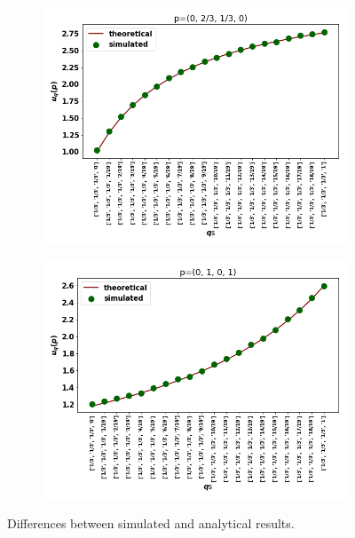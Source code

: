 \documentclass[10pt]{article}
\begin{document}
\begin{figure}[!htbp]
\begin{center}
    \begin{subfigure}{0.45\textwidth}
        \includegraphics[width=\linewidth]{img/validation_img_two.png}
    \end{subfigure}
    \begin{subfigure}{0.45\textwidth}
        \includegraphics[width=\linewidth]{img/validation_img_three.png}
    \end{subfigure}
\end{center}
\caption{Differences between simulated and analytical results.}
\label{fig:analytical_simulated}
\end{figure}
\end{document}
